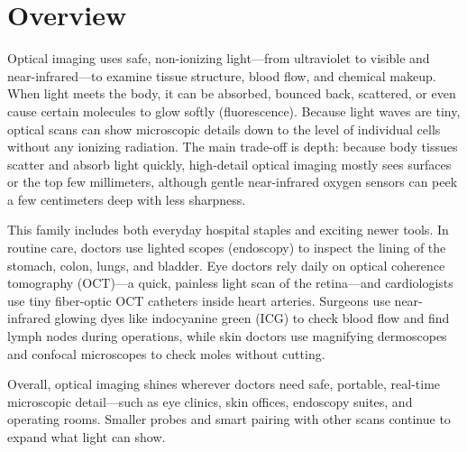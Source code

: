 \label{ch:infographic-optical-imaging-overview}

\section{Overview}

Optical imaging uses safe, non-ionizing light---from ultraviolet to visible and near-infrared---to examine tissue structure, blood flow, and chemical makeup. When light meets the body, it can be absorbed, bounced back, scattered, or even cause certain molecules to glow softly (fluorescence). Because light waves are tiny, optical scans can show microscopic details down to the level of individual cells without any ionizing radiation. The main trade-off is depth: because body tissues scatter and absorb light quickly, high-detail optical imaging mostly sees surfaces or the top few millimeters, although gentle near-infrared oxygen sensors can peek a few centimeters deep with less sharpness.

This family includes both everyday hospital staples and exciting newer tools. In routine care, doctors use lighted scopes (endoscopy) to inspect the lining of the stomach, colon, lungs, and bladder. Eye doctors rely daily on optical coherence tomography (OCT)---a quick, painless light scan of the retina---and cardiologists use tiny fiber-optic OCT catheters inside heart arteries. Surgeons use near-infrared glowing dyes like indocyanine green (ICG) to check blood flow and find lymph nodes during operations, while skin doctors use magnifying dermoscopes and confocal microscopes to check moles without cutting.

Overall, optical imaging shines wherever doctors need safe, portable, real-time microscopic detail---such as eye clinics, skin offices, endoscopy suites, and operating rooms. Smaller probes and smart pairing with other scans continue to expand what light can show.

